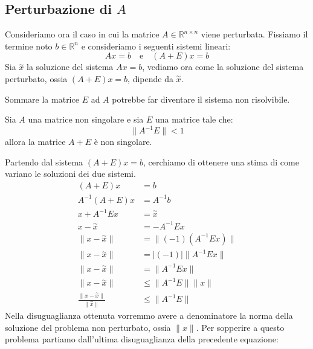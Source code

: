 \subsection{Perturbazione di $A$}
Consideriamo ora il caso in cui la matrice $A \in \mathbb{R}^{n \times n}$ viene
perturbata. Fissiamo il termine noto $b \in \mathbb{R}^n$ e consideriamo i seguenti
sistemi lineari:
\begin{equation}
    Ax = b \quad \text{e} \quad (A + E)x = b
\end{equation}
Sia $\stackrel{\sim}{x}$ la soluzione del sistema $Ax = b$, vediamo ora come la
soluzione del sistema perturbato, ossia $(A + E)x = b$, dipende da $\stackrel{\sim}{x}$.
\begin{nota}
    Sommare la matrice $E$ ad $A$ potrebbe far diventare il sistema non risolvibile.
\end{nota}
\begin{teorema}
    Sia $A$ una matrice non singolare e sia $E$ una matrice tale che:
    \begin{equation*}
        \| A^{-1}E \| < 1 
    \end{equation*}
    allora la matrice $A + E$ è non singolare.
\end{teorema}
Partendo dal sistema $(A + E)x = b$, cerchiamo di ottenere una stima di come 
variano le soluzioni dei due sistemi.
\begin{equation*}
    \begin{aligned}
        (A + E)x &= b \\
        A^{-1}(A + E)x &= A^{-1}b \\
        x + A^{-1}Ex &= \stackrel{\sim}{x} \\
        x - \stackrel{\sim}{x} &= - A^{-1}Ex \\
        \| x - \stackrel{\sim}{x} \| & =  \|(-1) (A^{-1} E x)\| \\
        \| x - \stackrel{\sim}{x} \| & =  |(-1)| \|A^{-1} E x\| \\    
        \| x - \stackrel{\sim}{x} \| & =  \|A^{-1} E x\| \\
        \|x - \stackrel{\sim}{x}\| &\leq \|A^{-1}E\|\|x\| \\
        \frac{\|x - \stackrel{\sim}{x}\|}{\|\stackrel{\sim}{x}\|} &\leq \|A^{-1}E\|
    \end{aligned}
\end{equation*}
Nella disuguaglianza ottenuta vorremmo avere a denominatore la norma della 
soluzione del problema non perturbato, ossia $\|x\|$. Per sopperire a questo 
problema partiamo dall'ultima disuguaglianza della precedente equazione:
